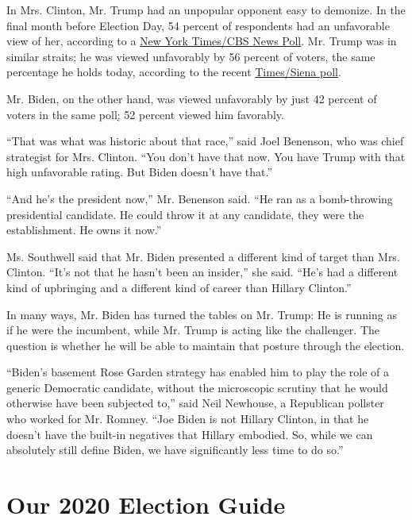 In Mrs. Clinton, Mr. Trump had an unpopular opponent easy to demonize.
In the final month before Election Day, 54 percent of respondents had an
unfavorable view of her, according to a
\href{https://www.nytimes.com/interactive/2016/11/03/us/politics/poll-times-cbs-news.html}{New
York Times/CBS News Poll}. Mr. Trump was in similar straits; he was
viewed unfavorably by 56 percent of voters, the same percentage he holds
today, according to the recent
\href{https://www.nytimes.com/2020/06/24/us/politics/trump-biden-poll-nyt-upshot-siena-college.html}{Times/Siena
poll}.

Mr. Biden, on the other hand, was viewed unfavorably by just 42 percent
of voters in the same
poll\href{-https:/www.nytimes.com/2020/06/24/us/politics/trump-biden-poll-nyt-upshot-siena-college.html}{;}
52 percent viewed him favorably.

``That was what was historic about that race,'' said Joel Benenson, who
was chief strategist for Mrs. Clinton. ``You don't have that now. You
have Trump with that high unfavorable rating. But Biden doesn't have
that.''

``And he's the president now,'' Mr. Benenson said. ``He ran as a
bomb-throwing presidential candidate. He could throw it at any
candidate, they were the establishment. He owns it now.''

Ms. Southwell said that Mr. Biden presented a different kind of target
than Mrs. Clinton. ``It's not that he hasn't been an insider,'' she
said. ``He's had a different kind of upbringing and a different kind of
career than Hillary Clinton.''

In many ways, Mr. Biden has turned the tables on Mr. Trump: He is
running as if he were the incumbent, while Mr. Trump is acting like the
challenger. The question is whether he will be able to maintain that
posture through the election.

``Biden's basement Rose Garden strategy has enabled him to play the role
of a generic Democratic candidate, without the microscopic scrutiny that
he would otherwise have been subjected to,'' said Neil Newhouse, a
Republican pollster who worked for Mr. Romney. ``Joe Biden is not
Hillary Clinton, in that he doesn't have the built-in negatives that
Hillary embodied. So, while we can absolutely still define Biden, we
have significantly less time to do so.''

\hypertarget{our-2020-election-guide}{%
\section{Our 2020 Election Guide}\label{our-2020-election-guide}}

